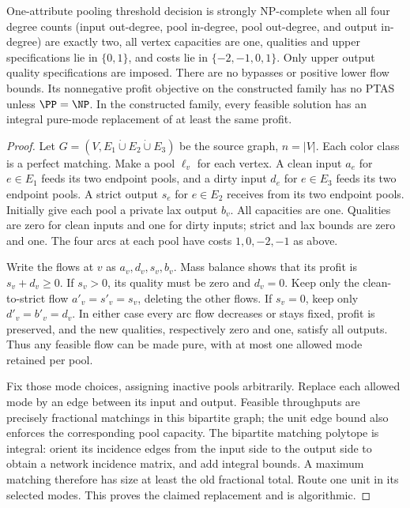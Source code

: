 \begin{theorem}\label{s3:all-two-thm}
One-attribute pooling threshold decision is strongly NP-complete when all
four degree counts (input out-degree, pool in-degree, pool out-degree,
and output in-degree)
are exactly two, all vertex capacities are one, qualities and upper
specifications lie in $\{0,1\}$, and costs lie in $\{-2,-1,0,1\}$.
Only upper output quality specifications are imposed. There are no
bypasses or positive lower flow bounds. Its nonnegative
profit objective on the constructed family has no PTAS unless
$\PP=\NP$. In the constructed family, every feasible solution has an integral
pure-mode replacement of at least the same profit.
\end{theorem}
\begin{proof}
Let $G=(V,E_1\mathbin{\dot\cup}E_2\mathbin{\dot\cup}E_3)$ be the
source graph, $n=|V|$. Each color class is a perfect matching. Make a
pool $\ell_v$ for each vertex. A clean input $a_e$ for $e\in E_1$
feeds its two endpoint pools, and a dirty input $d_e$ for $e\in E_3$
feeds its two endpoint pools. A strict output $s_e$ for $e\in E_2$
receives from its two endpoint pools. Initially give each pool a private
lax output $b_v$. All capacities are one. Qualities are zero for clean
inputs and one for dirty inputs; strict and lax bounds are zero and one.
The four arcs at each pool have costs $1,0,-2,-1$ as above.

Write the flows at $v$ as $a_v,d_v,s_v,b_v$. Mass balance shows that
its profit is $s_v+d_v\ge0$. If $s_v>0$, its quality must be zero and
$d_v=0$. Keep only the clean-to-strict flow
$a'_v=s'_v=s_v$, deleting the other flows. If $s_v=0$, keep only
$d'_v=b'_v=d_v$. In either case every arc flow decreases or stays fixed,
profit is preserved, and the new qualities, respectively zero and one,
satisfy all outputs. Thus any feasible flow can be made pure, with at
most one allowed mode retained per pool.

Fix those mode choices, assigning inactive pools arbitrarily. Replace
each allowed mode by an edge between its input and output. Feasible
throughputs are precisely fractional matchings in this bipartite graph;
the unit edge bound also enforces the corresponding pool capacity.
The bipartite matching polytope is integral: orient its incidence edges
from the input side to the output side to obtain a network incidence
matrix, and add integral bounds. A maximum matching therefore has size
at least the old fractional total. Route one unit in its selected modes.
This proves the claimed replacement and is algorithmic.


\end{proof}
